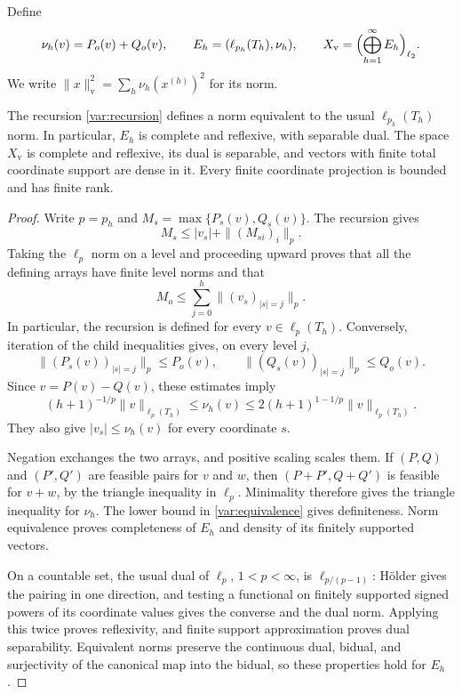 Define
\[
 \nu_h(v)=P_o(v)+Q_o(v),\qquad
 E_h=(\ell_{p_h}(T_h),\nu_h),\qquad
 X_{\mathrm v}=\Bigl(\bigoplus_{h=1}^{\infty}E_h\Bigr)_{\ell_2}.
\]
We write $\|x\|_{\mathrm v}^2=\sum_h\nu_h(x^{(h)})^2$ for its norm.

\begin{proposition}\label{var:space}
The recursion \eqref{var:recursion} defines a norm equivalent to the
usual $\ell_{p_h}(T_h)$ norm.  In particular, $E_h$ is complete and
reflexive, with separable dual.  The space $X_{\mathrm v}$ is complete
and reflexive, its dual is separable, and vectors with finite total
coordinate support are dense in it.  Every finite coordinate
projection is bounded and has finite rank.
\end{proposition}

\begin{proof}
Write $p=p_h$ and $M_s=\max\{P_s(v),Q_s(v)\}$.  The recursion gives
\[
 M_s\le |v_s|+\|(M_{si})_i\|_p.
\]
Taking the $\ell_p$ norm on a level and proceeding upward proves
that all the defining arrays have finite level norms and that
\[
 M_o\le\sum_{j=0}^{h}\|(v_s)_{|s|=j}\|_p.
\]
In particular, the recursion is defined for every $v\in\ell_p(T_h)$.
Conversely, iteration of the child inequalities gives, on every
level $j$,
\[
 \|(P_s(v))_{|s|=j}\|_p\le P_o(v),\qquad
 \|(Q_s(v))_{|s|=j}\|_p\le Q_o(v).
\]
Since $v=P(v)-Q(v)$, these estimates imply
\begin{equation}\label{var:equivalence}
 (h+1)^{-1/p}\|v\|_{\ell_p(T_h)}
 \le\nu_h(v)
 \le 2(h+1)^{1-1/p}\|v\|_{\ell_p(T_h)}.
\end{equation}
They also give $|v_s|\le\nu_h(v)$ for every coordinate $s$.

Negation exchanges the two arrays, and positive scaling scales them.
If $(P,Q)$ and $(P',Q')$ are feasible pairs for $v$ and $w$, then
$(P+P',Q+Q')$ is feasible for $v+w$, by the triangle inequality in
$\ell_p$.  Minimality therefore gives the triangle inequality for
$\nu_h$.  The lower bound in \eqref{var:equivalence} gives
definiteness.  Norm equivalence proves completeness of $E_h$ and
density of its finitely supported vectors.

On a countable set, the usual dual of $\ell_p$, $1<p<\infty$,
is $\ell_{p/(p-1)}$: H\"older gives the pairing in one direction,
and testing a functional on finitely supported signed powers of its
coordinate values gives the converse and the dual norm.  Applying
this twice proves reflexivity, and finite support approximation
proves dual separability.  Equivalent norms preserve the continuous
dual, bidual, and surjectivity of the canonical map into the bidual,
so these properties hold for $E_h$.


\end{proof}
